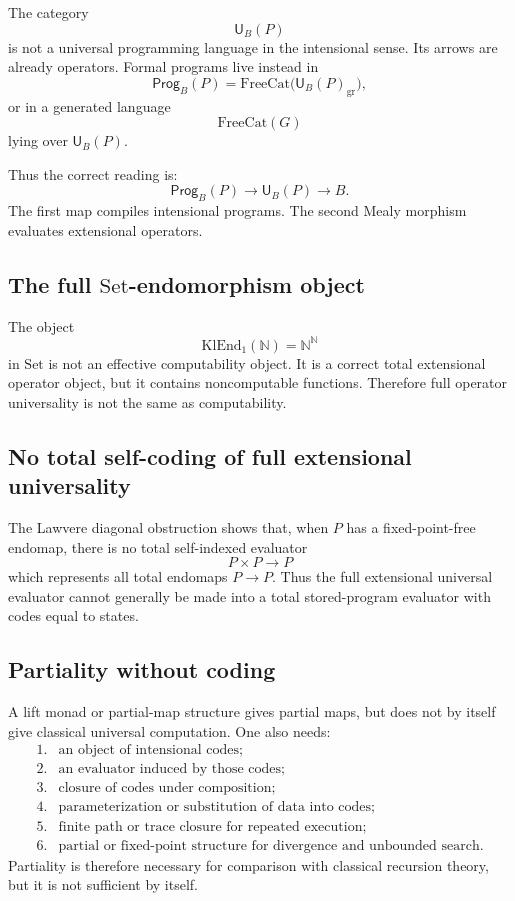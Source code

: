 The category
\[
        \mathsf U_B(P)
\]
is not a universal programming language in the intensional sense.  Its arrows are already
operators.  Formal programs live instead in
\[
        \mathsf{Prog}_B(P)
        =
        \mathrm{FreeCat}\bigl(\mathsf U_B(P)_{\mathrm{gr}}\bigr),
\]
or in a generated language
\[
        \mathrm{FreeCat}(G)
\]
lying over \(\mathsf U_B(P)\).

Thus the correct reading is:
\[
        \mathsf{Prog}_B(P)
        \longrightarrow
        \mathsf U_B(P)
        \longrightarrow
        B.
\]
The first map compiles intensional programs.  The second Mealy morphism evaluates extensional
operators.

\subsection{The full \(\mathrm{Set}\)-endomorphism object}

The object
\[
        \mathrm{KlEnd}_1(\mathbb N)
        =
        \mathbb N^{\mathbb N}
\]
in \(\mathrm{Set}\) is not an effective computability object.  It is a correct total extensional
operator object, but it contains noncomputable functions.  Therefore full operator universality is
not the same as computability.

\subsection{No total self-coding of full extensional universality}

The Lawvere diagonal obstruction shows that, when \(P\) has a fixed-point-free endomap, there is no
total self-indexed evaluator
\[
        P\times P\to P
\]
which represents all total endomaps \(P\to P\).  Thus the full extensional universal evaluator
cannot generally be made into a total stored-program evaluator with codes equal to states.

\subsection{Partiality without coding}

A lift monad or partial-map structure gives partial maps, but does not by itself give classical
universal computation.  One also needs:
\[
\begin{array}{ll}
1. & \text{an object of intensional codes;}\\
2. & \text{an evaluator induced by those codes;}\\
3. & \text{closure of codes under composition;}\\
4. & \text{parameterization or substitution of data into codes;}\\
5. & \text{finite path or trace closure for repeated execution;}\\
6. & \text{partial or fixed-point structure for divergence and unbounded search.}
\end{array}
\]
Partiality is therefore necessary for comparison with classical recursion theory, but it is not
sufficient by itself.

